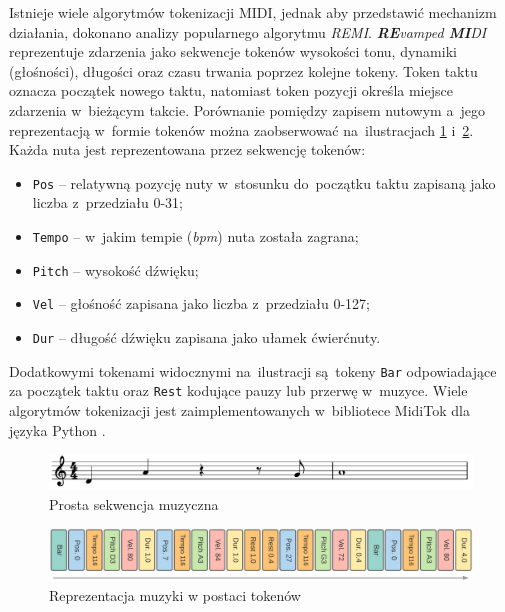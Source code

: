 \documentclass[data-science]{agh-wi} %
\begin{document}
Istnieje wiele algorytmów tokenizacji MIDI, jednak aby przedstawić mechanizm działania, dokonano analizy popularnego algorytmu \textit{REMI}. \textit{\textbf{RE}vamped \textbf{MI}DI} reprezentuje zdarzenia jako sekwencje tokenów wysokości tonu, dynamiki (głośności), długości oraz czasu trwania poprzez kolejne tokeny. Token taktu oznacza początek nowego taktu, natomiast token pozycji określa miejsce zdarzenia w~bieżącym takcie. Porównanie pomiędzy zapisem nutowym a~jego reprezentacją w~formie tokenów można zaobserwować na~ilustracjach \ref*{fig:remi_notes} i~\ref*{fig:remi_tokens}. Każda nuta jest reprezentowana przez sekwencję tokenów:
\begin{itemize}
    \item \texttt{Pos} -- relatywną pozycję nuty w~stosunku do~początku taktu zapisaną jako liczba z~przedziału 0-31;
    \item \texttt{Tempo} -- w~jakim tempie (\textit{bpm}) nuta została zagrana;
    \item \texttt{Pitch} -- wysokość dźwięku;
    \item \texttt{Vel} -- głośność zapisana jako liczba z~przedziału 0-127;
    \item \texttt{Dur} -- długość dźwięku zapisana jako ułamek ćwierćnuty.
\end{itemize}
Dodatkowymi tokenami widocznymi na~ilustracji są~tokeny \texttt{Bar} odpowiadające za początek taktu oraz \texttt{Rest} kodujące pauzy lub przerwę w~muzyce. Wiele algorytmów tokenizacji jest zaimplementowanych w~bibliotece MidiTok dla języka Python \cite{miditok2021}.

\begin{figure}[ht!]
    \begin{center}
        \includegraphics[width=0.9\linewidth]{./img/tokenizer_notes.pdf}
    \end{center}
    \caption{Prosta sekwencja muzyczna}\label{fig:remi_notes}
\end{figure}

\begin{figure}[ht!]
    \begin{center}
        \includegraphics[width=0.9\linewidth]{./img/remi.png}
    \end{center}
    \caption{Reprezentacja muzyki w postaci tokenów}\label{fig:remi_tokens}
\end{figure}
\end{document}

